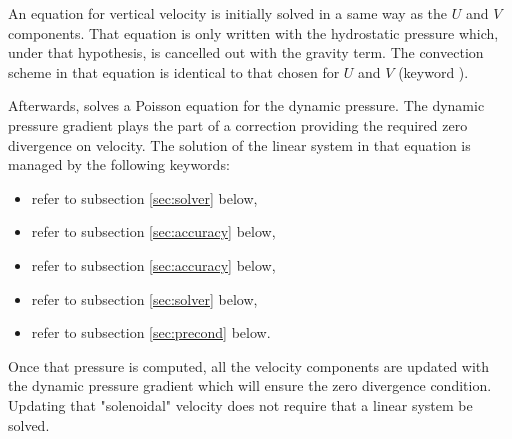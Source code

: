 An equation for vertical velocity is initially solved in a same way as the
$U$ and $V$ components. That equation is only written with the
hydrostatic pressure which, under that hypothesis, is cancelled out with the
gravity term. The convection scheme in that equation is identical to that
chosen for $U$ and $V$ (keyword ).
%
%
%
%

Afterwards,  solves a Poisson equation for the dynamic pressure. The
dynamic pressure gradient plays the part of a correction providing the required
zero divergence on velocity. The solution of the linear system in that equation
is managed by the following keywords:

\begin{itemize}
\item {} refer to subsection \ref{sec:solver} below,

\item {} refer to subsection \ref{sec:accuracy}
below,

\item {} refer to subsection \ref{sec:accuracy} below,

\item {} refer to subsection \ref{sec:solver} below,

\item {} refer to subsection \ref{sec:precond} below.
\end{itemize}

Once that pressure is computed, all the velocity components are updated with
the dynamic pressure gradient which will ensure the zero divergence condition.
Updating that "solenoidal" velocity does not require that a linear system be
solved.
\\

